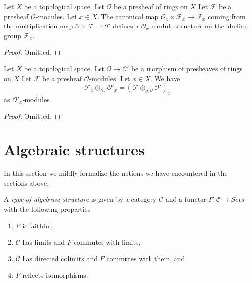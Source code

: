 \begin{lemma}
\label{lemma-stalk-module}
Let $X$ be a topological space.
Let $\mathcal{O}$ be a presheaf of rings on $X$
Let $\mathcal{F}$ be a presheaf $\mathcal{O}$-modules.
Let $x \in X$.
The canonical map $\mathcal{O}_x \times \mathcal{F}_x
\to \mathcal{F}_x$ coming from the multiplication map
$\mathcal{O}\times\mathcal{F} \to \mathcal{F}$ defines
a $\mathcal{O}_x$-module structure on the abelian group
$\mathcal{F}_x$.
\end{lemma}

\begin{proof}
Omitted.
\end{proof}

\begin{lemma}
\label{lemma-stalk-tensor-presheaf-modules}
Let $X$ be a topological space.
Let $\mathcal{O} \to \mathcal{O}'$ be a morphism of
presheaves of rings on $X$
Let $\mathcal{F}$ be a presheaf $\mathcal{O}$-modules.
Let $x \in X$. We have
$$
\mathcal{F}_x \otimes_{\mathcal{O}_x} \mathcal{O}'_x
=
(\mathcal{F} \otimes_{p, \mathcal{O}} \mathcal{O}')_x
$$
as $\mathcal{O}'_x$-modules.
\end{lemma}

\begin{proof}
Omitted.
\end{proof}


\section{Algebraic structures}
\label{section-algebraic-structures}

\noindent
In this section we mildly formalize the notions we have
encountered in the sections above.

\begin{definition}
\label{definition-algebraic-structure}
A {\it type of algebraic structure} is given by a category $\mathcal{C}$
and a functor $F : \mathcal{C} \to \textit{Sets}$ with the
following properties
\begin{enumerate}
\item $F$ is faithful,
\item $\mathcal{C}$ has limits and $F$ commutes with limits,
\item $\mathcal{C}$ has directed colimits and $F$ commutes with them, and
\item $F$ reflects isomorphisms.
\end{enumerate}
\end{definition}

